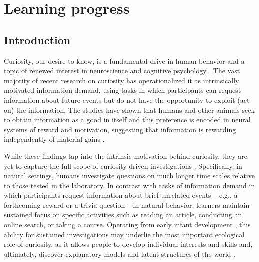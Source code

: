 \chapter{Learning progress}\label{ch:learning-progress}


\section{Introduction}
    Curiosity, our desire to know, is a fundamental drive in human behavior and a topic of renewed interest in neuroscience and cognitive psychology \cite{gottlieb2013information,kidd2015psychology}. The vast majority of recent research on curiosity has operationalized it as intrinsically motivated information demand, using tasks in which participants can request information about future events but do not have the opportunity to exploit (act on) the information. The studies have shown that humans and other animals seek to obtain information as a good in itself and this preference is encoded in neural systems of reward and motivation, suggesting that information is rewarding independently of material gains \cite{duan2020effect,lau2020shared,kang2009wick,bromberg2009midbrain}.

    While these findings tap into the intrinsic motivation behind curiosity, they are yet to capture the full scope of curiosity-driven investigations \cite{gottlieb2018towards}. Specifically, in natural settings, humans investigate questions on much longer time scales relative to those tested in the laboratory.  In contrast with  tasks of information demand in which participants request information about brief unrelated events – e.g., a forthcoming reward or a trivia question – in natural behavior, learners maintain sustained focus on specific activities such as reading an article, conducting an online search, or taking a course. Operating from early infant development \cite{Bazhydai21}, this ability for sustained investigations may underlie the most important ecological role of curiosity, as it allows people to develop individual interests and skills and, ultimately, discover explanatory models and latent structures of the world \cite{hidi2019interest,schwartenbeck2019computational,dubey2019reconciling}.
    
